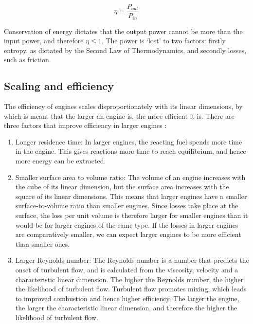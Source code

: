 \[ \eta = \frac{P_{out}}{P_{in}} \]

Conservation of energy dictates that the output power cannot be more than the
input power, and therefore \(\eta \leq 1\). The power is `lost' to two factors:
firstly entropy, as dictated by the Second Law of Thermodynamics, and secondly
losses, such as friction.

\subsection{Scaling and efficiency} \label{par:scaling}

The efficiency of engines scales disproportionately with its linear dimensions,
by which is meant that the larger an engine is, the more efficient it is. There
are three factors that improve efficiency in larger engines \autocite{Brown2017}:

\begin{enumerate}

\item Longer residence time: In larger engines, the reacting fuel spends more
time in the engine. This gives reactions more time to reach equilibrium, and
hence more energy can be extracted.

\item Smaller surface area to volume ratio: The volume of an engine increases
with the cube of its linear dimension, but the surface area increases with the
square of its linear dimensions. This means that larger engines have a smaller
surface-to-volume ratio than smaller engines. Since losses take place at the
surface, the loss per unit volume is therefore larger for smaller engines than
it would be for larger engines of the same type. If the losses in larger engines
are comparatively smaller, we can expect larger engines to be more
efficient than smaller ones. 
  
\item Larger Reynolds number: The Reynolds number is a number that predicts the
onset of turbulent flow, and is calculated from the viscosity, velocity and a
characteristic linear dimension.  The higher the Reynolds number, the higher the
likelihood of turbulent flow. Turbulent flow promotes mixing, which leads to
improved combustion and hence higher efficiency. The larger the engine, the
larger the characteristic linear dimension, and therefore the higher the
likelihood of turbulent flow.

\end{enumerate}

